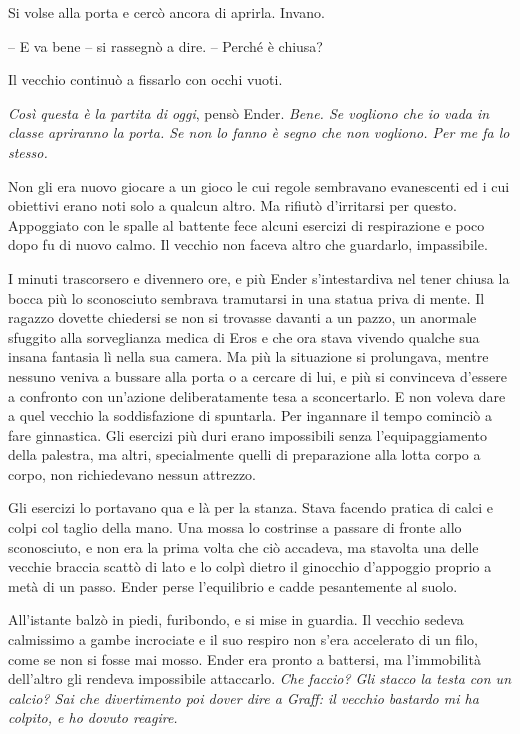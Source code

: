 {Si volse alla porta e cercò ancora di aprirla. Invano.}

{-- E va bene -- si rassegnò a dire. -- Perché è chiusa?}

{Il vecchio continuò a fissarlo con occhi vuoti.}

\emph{{Così questa è la partita di oggi}}{, \emph{} pensò Ender.
	\emph{Bene. Se vogliono che io vada in classe apriranno la porta. Se non
		lo fanno è segno che non vogliono. Per me fa lo stesso.}}

{Non gli era nuovo giocare a un gioco le cui regole sembravano
	evanescenti ed i cui obiettivi erano noti solo a qualcun altro. Ma
	rifiutò d'irritarsi per questo. Appoggiato con le spalle al battente
	fece alcuni esercizi di respirazione e poco dopo fu di nuovo calmo. Il
	vecchio non faceva altro che guardarlo, impassibile.}

{I minuti trascorsero e divennero ore, e più Ender s'intestardiva nel
	tener chiusa la bocca più lo sconosciuto sembrava tramutarsi in una
	statua priva di mente. Il ragazzo dovette chiedersi se non si trovasse
	davanti a un pazzo, un anormale sfuggito alla sorveglianza medica di
	Eros e che ora stava vivendo qualche sua insana fantasia lì nella sua
	camera. Ma più la situazione si prolungava, mentre nessuno veniva a
	bussare alla porta o a cercare di lui, e più si convinceva d'essere a
	confronto con un'azione deliberatamente tesa a sconcertarlo. E non
	voleva dare a quel vecchio la soddisfazione di spuntarla. Per ingannare
	il tempo cominciò a fare ginnastica. Gli esercizi più duri erano
	impossibili senza l'equipaggiamento della palestra, ma altri,
	specialmente quelli di preparazione alla lotta corpo a corpo, non
	richiedevano nessun attrezzo.}

{Gli esercizi lo portavano qua e là per la stanza. Stava facendo pratica
	di calci e colpi col taglio della mano. Una mossa lo costrinse a passare
	di fronte allo sconosciuto, e non era la prima volta che ciò accadeva,
	ma stavolta una delle vecchie braccia scattò di lato e lo colpì dietro
	il ginocchio d'appoggio proprio a metà di un passo. Ender perse
	l'equilibrio e cadde pesantemente al suolo.}

{All'istante balzò in piedi, furibondo, e si mise in guardia. Il vecchio
	sedeva calmissimo a gambe incrociate e il suo respiro non s'era
	accelerato di un filo, come se non si fosse mai mosso. Ender era pronto
	a battersi, ma l'immobilità dell'altro gli rendeva impossibile
	attaccarlo. \emph{Che faccio? Gli stacco la testa con un calcio? Sai che
		divertimento poi dover dire a Graff: il vecchio bastardo mi ha colpito,
		e ho dovuto reagire.}}

